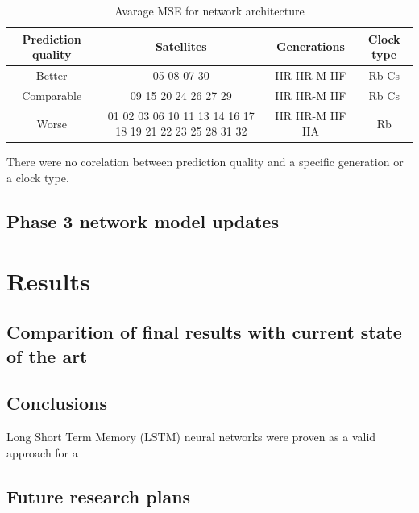 \begin{table}[ht] 
	\centering
	\caption{Avarage MSE for network architecture}
	\label{tab:phase_2_groups}
	\begin{tabular}{cccc}
		\hline
		\hline
		Prediction quality& Satellites& Generations& Clock type  \\
		\hline
		Better& 05 08 07 30& IIR IIR-M IIF& Rb Cs\\
		Comparable& 09 15 20 24 26 27 29& IIR IIR-M IIF& Rb Cs\\
		Worse& 01 02 03 06 10 11 13 14 16 17 18 19 21 22 23 25 28 31 32& IIR IIR-M IIF IIA& Rb\\
		\hline
		\hline
	\end{tabular}
There were no corelation between  prediction quality and a specific generation or a clock type.

\end{table}
\subsection{Phase 3 network model updates}


\section{Results}

\subsection{Comparition of final results with current state of the art}

\subsection{Conclusions}
Long Short Term Memory (LSTM) neural networks were proven as a valid approach for a 


\subsection{Future research plans}






